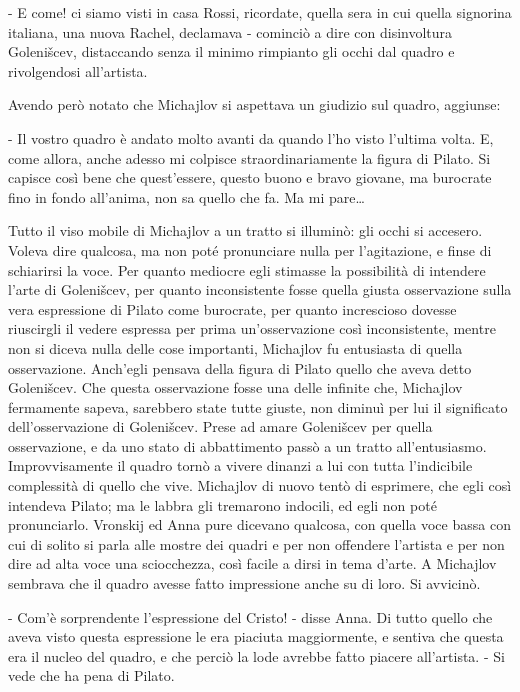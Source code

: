 - E come! ci siamo visti in casa Rossi, ricordate, quella sera in cui quella signorina italiana, una nuova Rachel, declamava - cominciò a dire con disinvoltura Golenišcev, distaccando senza il minimo rimpianto gli occhi dal quadro e rivolgendosi all'artista. 

Avendo però notato che Michajlov si aspettava un giudizio sul quadro, aggiunse: 

- Il vostro quadro è andato molto avanti da quando l'ho visto l'ultima volta. E, come allora, anche adesso mi colpisce straordinariamente la figura di Pilato. Si capisce così bene che quest'essere, questo buono e bravo giovane, ma burocrate fino in fondo all'anima, non sa quello che fa. Ma mi pare\ldots{} 

Tutto il viso mobile di Michajlov a un tratto si illuminò: gli occhi si accesero. Voleva dire qualcosa, ma non poté pronunciare nulla per l'agitazione, e finse di schiarirsi la voce. Per quanto mediocre egli stimasse la possibilità di intendere l'arte di Golenišcev, per quanto inconsistente fosse quella giusta osservazione sulla vera espressione di Pilato come burocrate, per quanto increscioso dovesse riuscirgli il vedere espressa per prima un'osservazione così inconsistente, mentre non si diceva nulla delle cose importanti, Michajlov fu entusiasta di quella osservazione. Anch'egli pensava della figura di Pilato quello che aveva detto Golenišcev. Che questa osservazione fosse una delle infinite che, Michajlov fermamente sapeva, sarebbero state tutte giuste, non diminuì per lui il significato dell'osservazione di Golenišcev. Prese ad amare Golenišcev per quella osservazione, e da uno stato di abbattimento passò a un tratto all'entusiasmo. Improvvisamente il quadro tornò a vivere dinanzi a lui con tutta l'indicibile complessità di quello che vive. Michajlov di nuovo tentò di esprimere, che egli così intendeva Pilato; ma le labbra gli tremarono indocili, ed egli non poté pronunciarlo. Vronskij ed Anna pure dicevano qualcosa, con quella voce bassa con cui di solito si parla alle mostre dei quadri e per non offendere l'artista e per non dire ad alta voce una sciocchezza, così facile a dirsi in tema d'arte. A Michajlov sembrava che il quadro avesse fatto impressione anche su di loro. Si avvicinò. 

- Com'è sorprendente l'espressione del Cristo! - disse Anna. Di tutto quello che aveva visto questa espressione le era piaciuta maggiormente, e sentiva che questa era il nucleo del quadro, e che perciò la lode avrebbe fatto piacere all'artista. - Si vede che ha pena di Pilato. 

